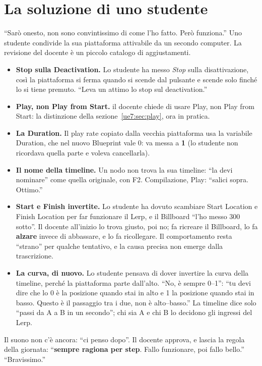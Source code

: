 \section{La soluzione di uno studente}
\label{ue7:sec:soluzione}

``Sarò onesto, non sono convintissimo di come l'ho fatto. Però funziona.'' Uno studente
condivide la sua piattaforma attivabile da un secondo computer. La revisione del docente
è un piccolo catalogo di aggiustamenti.
\begin{itemize}
  \item \textbf{Stop sulla Deactivation.} Lo studente ha messo \emph{Stop} sulla
        disattivazione, così la piattaforma si ferma quando si scende dal pulsante e
        scende solo finché lo si tiene premuto. ``Leva un attimo lo stop sul
        deactivation.''
  \item \textbf{Play, non Play from Start.} il docente chiede di usare Play, non Play from
        Start: la distinzione della sezione~\ref{ue7:sec:play}, ora in pratica.
  \item \textbf{La Duration.} Il play rate copiato dalla vecchia piattaforma usa la
        variabile Duration, che nel nuovo Blueprint vale 0: va messa a \textbf{1} (lo
        studente non ricordava quella parte e voleva cancellarla).
  \item \textbf{Il nome della timeline.} Un nodo non trova la sua timeline: ``la devi
        nominare'' come quella originale, con F2. Compilazione, Play: ``salici sopra.
        Ottimo.''
  \item \textbf{Start e Finish invertite.} Lo studente ha dovuto scambiare Start Location
        e Finish Location per far funzionare il Lerp, e il Billboard ``l'ho messo 300
        sotto''. Il docente all'inizio lo trova giusto, poi no; fa ricreare il
        Billboard, lo fa \textbf{alzare} invece di abbassare, e lo fa ricollegare. Il
        comportamento resta ``strano'' per qualche tentativo, e la causa precisa non
        emerge dalla trascrizione.
  \item \textbf{La curva, di nuovo.} Lo studente pensava di dover invertire la curva
        della timeline, perché la piattaforma parte dall'alto. ``No, è sempre 0--1'':
        ``tu devi dire che lo 0 è la posizione quando stai in alto e 1 la posizione
        quando stai in basso. Questo è il passaggio tra i due, non è alto--basso.'' La
        timeline dice solo ``passi da A a B in un secondo''; chi sia A e chi B lo
        decidono gli ingressi del Lerp.
\end{itemize}
Il suono non c'è ancora: ``ci penso dopo''. Il docente approva, e lascia la regola della
giornata: ``\textbf{sempre ragiona per step}. Fallo funzionare, poi fallo bello.''
``Bravissimo.''

